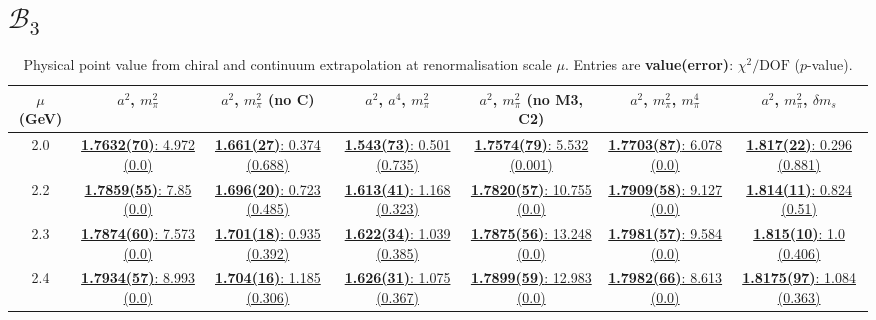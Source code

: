\documentclass[12pt]{extarticle}
\begin{document}
\section{$\mathcal{B}_3$}
\begin{table}[h!]
\begin{center}
\begin{tabular}{|c|c|c|c|c|c|c|}
\hline
$\mu$ (GeV) & $a^2$, $m_\pi^2$& $a^2$, $m_\pi^2$ (no C)& $a^2$, $a^4$, $m_\pi^2$& $a^2$, $m_\pi^2$ (no M3, C2)& $a^2$, $m_\pi^2$, $m_\pi^4$& $a^2$, $m_\pi^2$, $\delta m_s$\\
\hline
2.0& \hyperlink{SSmPP/NPR/a2m2_20.pdf.1}{\textbf{1.7632(70)}: 4.972 (0.0)} & \hyperlink{SSmPP/NPR/a2m2noC_20.pdf.1}{\textbf{1.661(27)}: 0.374 (0.688)} & \hyperlink{SSmPP/NPR/a2a4m2_20.pdf.1}{\textbf{1.543(73)}: 0.501 (0.735)} & \hyperlink{SSmPP/NPR/a2m2mcut_20.pdf.1}{\textbf{1.7574(79)}: 5.532 (0.001)} & \hyperlink{SSmPP/NPR/a2m2m4_20.pdf.1}{\textbf{1.7703(87)}: 6.078 (0.0)} & \hyperlink{SSmPP/NPR/a2m2delm_20.pdf.1}{\textbf{1.817(22)}: 0.296 (0.881)}\\
2.2& \hyperlink{SSmPP/NPR/a2m2_22.pdf.1}{\textbf{1.7859(55)}: 7.85 (0.0)} & \hyperlink{SSmPP/NPR/a2m2noC_22.pdf.1}{\textbf{1.696(20)}: 0.723 (0.485)} & \hyperlink{SSmPP/NPR/a2a4m2_22.pdf.1}{\textbf{1.613(41)}: 1.168 (0.323)} & \hyperlink{SSmPP/NPR/a2m2mcut_22.pdf.1}{\textbf{1.7820(57)}: 10.755 (0.0)} & \hyperlink{SSmPP/NPR/a2m2m4_22.pdf.1}{\textbf{1.7909(58)}: 9.127 (0.0)} & \hyperlink{SSmPP/NPR/a2m2delm_22.pdf.1}{\textbf{1.814(11)}: 0.824 (0.51)}\\
2.3& \hyperlink{SSmPP/NPR/a2m2_23.pdf.1}{\textbf{1.7874(60)}: 7.573 (0.0)} & \hyperlink{SSmPP/NPR/a2m2noC_23.pdf.1}{\textbf{1.701(18)}: 0.935 (0.392)} & \hyperlink{SSmPP/NPR/a2a4m2_23.pdf.1}{\textbf{1.622(34)}: 1.039 (0.385)} & \hyperlink{SSmPP/NPR/a2m2mcut_23.pdf.1}{\textbf{1.7875(56)}: 13.248 (0.0)} & \hyperlink{SSmPP/NPR/a2m2m4_23.pdf.1}{\textbf{1.7981(57)}: 9.584 (0.0)} & \hyperlink{SSmPP/NPR/a2m2delm_23.pdf.1}{\textbf{1.815(10)}: 1.0 (0.406)}\\
2.4& \hyperlink{SSmPP/NPR/a2m2_24.pdf.1}{\textbf{1.7934(57)}: 8.993 (0.0)} & \hyperlink{SSmPP/NPR/a2m2noC_24.pdf.1}{\textbf{1.704(16)}: 1.185 (0.306)} & \hyperlink{SSmPP/NPR/a2a4m2_24.pdf.1}{\textbf{1.626(31)}: 1.075 (0.367)} & \hyperlink{SSmPP/NPR/a2m2mcut_24.pdf.1}{\textbf{1.7899(59)}: 12.983 (0.0)} & \hyperlink{SSmPP/NPR/a2m2m4_24.pdf.1}{\textbf{1.7982(66)}: 8.613 (0.0)} & \hyperlink{SSmPP/NPR/a2m2delm_24.pdf.1}{\textbf{1.8175(97)}: 1.084 (0.363)}\\
\hline
\end{tabular}
\caption{Physical point value from chiral and continuum extrapolation at renormalisation scale $\mu$. Entries are \textbf{value(error)}: $\chi^2/\text{DOF}$ ($p$-value).}
\end{center}
\end{table}
\end{document}
